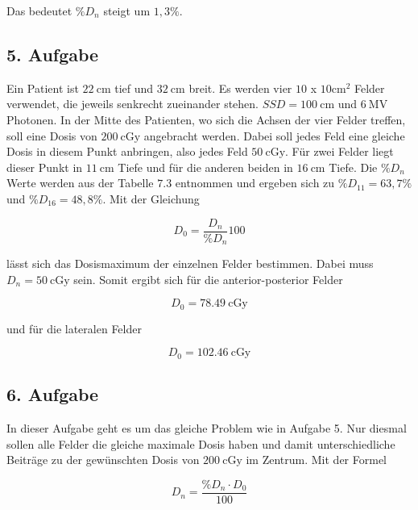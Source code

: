Das bedeutet $\%D_n$ steigt um $1,3\%$.

\subsection*{5. Aufgabe}

Ein Patient ist $\SI{22}{\centi\meter}$ tief und $\SI{32}{\centi\meter}$
breit. Es werden vier $10$ x $10 \si{\centi\meter\squared}$ Felder
verwendet, die jeweils senkrecht zueinander stehen.
$SSD=\SI{100}{\centi\meter}$ und $\SI{6}{\mega\volt}$ Photonen. In der
Mitte des Patienten, wo sich die Achsen der vier Felder treffen, soll eine
Dosis von $\SI{200}{\centi\gray}$ angebracht werden. Dabei soll jedes Feld
eine gleiche Dosis in diesem Punkt anbringen, also jedes Feld
$\SI{50}{\centi\gray}$. Für zwei Felder liegt dieser Punkt in
$\SI{11}{\centi\meter}$ Tiefe und für die anderen beiden in
$\SI{16}{\centi\meter}$ Tiefe. Die $\%D_n$ Werte werden aus der Tabelle $7.3$
entnommen und ergeben sich zu $\%D_{11} = 63,7\%$ und $\%D_{16} = 48,8\%$.
Mit der Gleichung

\begin{equation*}
  D_0 = \frac{D_n}{\%D_n} 100
\end{equation*}

lässt sich das Dosismaximum der einzelnen Felder bestimmen. Dabei muss
$D_n = \SI{50}{\centi\gray}$ sein.
Somit ergibt sich für die anterior-posterior Felder

\begin{equation*}
  D_0 = \SI{78.49}{\centi\gray}
\end{equation*}

und für die lateralen Felder

\begin{equation*}
  D_0 = \SI{102.46}{\centi\gray}
\end{equation*}

\subsection*{6. Aufgabe}

In dieser Aufgabe geht es um das gleiche Problem wie in Aufgabe 5. Nur diesmal
sollen alle Felder die gleiche maximale Dosis haben und damit
unterschiedliche Beiträge zu der gewünschten Dosis von $\SI{200}{\centi\gray}$
im Zentrum. Mit der Formel

\begin{equation*}
  D_n = \frac{\%D_n \cdot D_0}{100}
\end{equation*}


